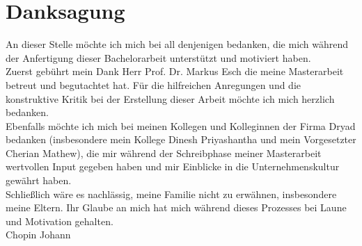
\bigskip

\begingroup
\let\clearpage\relax
\let\cleardoublepage\relax
\let\cleardoublepage\relax
\chapter*{Danksagung}
An dieser Stelle möchte ich mich bei all denjenigen bedanken, die mich während der Anfertigung dieser Bachelorarbeit unterstützt und motiviert haben.\\

Zuerst gebührt mein Dank Herr Prof. Dr. Markus Esch die meine Masterarbeit betreut und begutachtet hat. Für die hilfreichen Anregungen und die konstruktive Kritik bei der Erstellung dieser Arbeit möchte ich mich herzlich bedanken.\\

Ebenfalls möchte ich mich bei meinen Kollegen und Kolleginnen der Firma Dryad bedanken (insbesondere mein Kollege Dinesh Priyashantha und mein Vorgesetzter Cherian Mathew), die mir während der Schreibphase meiner Masterarbeit wertvollen Input gegeben haben und mir Einblicke in die Unternehmenskultur gewährt haben.\\

Schließlich wäre es nachlässig, meine Familie nicht zu erwähnen, insbesondere meine Eltern. Ihr Glaube an mich hat mich während dieses Prozesses bei Laune und Motivation gehalten.\\

Chopin Johann
\endgroup

